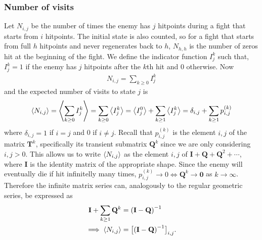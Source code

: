 \subsubsection{Number of visits}
Let $N_{i,j}$ be the number of times the enemy has $j$ hitpoints during a fight that starts from $i$ hitpoints. The initial state is also counted, so for a fight that starts from full $h$ hitpoints and never regenerates back to $h$, $N_{h,h}$ is the number of zeros hit at the beginning of the fight. We define the indicator function $I_j^k$ such that, $I_j^k = 1$ if the enemy has $j$ hitpoints after the $k$th hit and $0$ otherwise. Now
\begin{align}
	N_{i,j} = \sum_{k\geq 0}I_j^k
\end{align}
and the expected number of visits to state $j$ is
\begin{align}
	\left\langle N_{i,j} \right\rangle
	= \left\langle \sum_{k\geq 0}I_j^k \right\rangle
	= \sum_{k\geq 0}\left\langle I_j^k \right\rangle
	= \left\langle I_j^0 \right\rangle + \sum_{k\geq 1}\left\langle I_j^k \right\rangle
	= \delta_{i,j} + \sum_{k\geq 1}p_{i,j}^{(k)}
\end{align}
where $\delta_{i,j} = 1$ if $i=j$ and 0 if $i\neq j$. Recall that $p_{i,j}^{(k)}$ is the element $i,j$ of the matrix $\mathbf{T}^k$, specifically its transient submatrix $\mathbf{Q}^k$ since we are only considering $i,j > 0$. This allows us to write $\left\langle N_{i,j} \right\rangle$ as the element $i,j$ of $\mathbf{I} + \mathbf{Q} + \mathbf{Q}^2 + \cdots$, where $\mathbf{I}$ is the identity matrix of the appropriate shape. Since the enemy will eventually die if hit infinitelly many times, $p_{i,j}^{(k)} \rightarrow 0 \iff \mathbf{Q}^k \rightarrow \mathbf{0}$ as $k \rightarrow \infty$. Therefore the infinite matrix series can, analogously to the regular geometric series, be expressed as
\begin{align}
	\mathbf{I} + \sum_{k\geq 1}\mathbf{Q}^k
	&= {(\mathbf{I} - \mathbf{Q})}^{-1}\nonumber\\
	\implies \left\langle N_{i,j} \right\rangle &= \big[{(\mathbf{I} - \mathbf{Q})}^{-1}\big]_{i,j}\label{eq:visitsMatrix}.
\end{align}

\pagebreak
